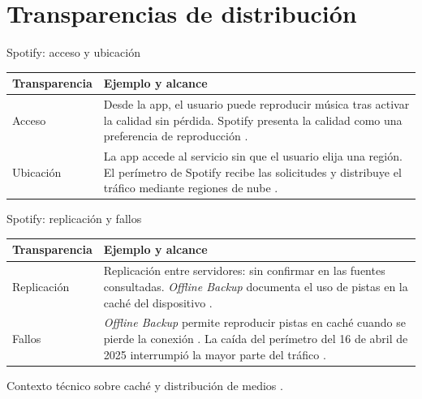 \section{Transparencias de distribución}

\begin{frame}{Spotify: acceso y ubicación}
  \small
  \begin{tabular}{@{}lp{}@{}}
    \textbf{Transparencia} & \textbf{Ejemplo y alcance} \\
    \hline
    Acceso &
      Desde la app, el usuario puede reproducir música
      tras activar la calidad sin pérdida. Spotify presenta la calidad
      como una preferencia de reproducción \cite{spotifyLossless2025}. \\[0.7em]
    Ubicación &
      La app accede al servicio sin que el usuario elija una región.
      El perímetro de Spotify recibe las solicitudes y distribuye el
      tráfico mediante regiones de nube \cite{spotifyIncident2025}. \\
  \end{tabular}
\end{frame}

\begin{frame}{Spotify: replicación y fallos}
  \small
  \begin{tabular}{@{}lp{}@{}}
    \textbf{Transparencia} & \textbf{Ejemplo y alcance} \\
    \hline
    Replicación &
      Replicación entre servidores: sin confirmar en las fuentes
      consultadas. \emph{Offline Backup} documenta el uso de pistas en
      la caché del dispositivo \cite{spotifyOffline2024}. \\[0.7em]
    Fallos &
      \emph{Offline Backup} permite reproducir pistas en caché cuando
      se pierde la conexión \cite{spotifyOffline2024}. La caída del
      perímetro del 16 de abril de 2025 interrumpió la mayor parte
      del tráfico \cite{spotifyIncident2025}. \\
  \end{tabular}

  \medskip
  {\footnotesize Contexto técnico sobre caché y distribución de medios
  \cite{viola2023media,van2023caching,nguyen2023edge}.}
\end{frame}
